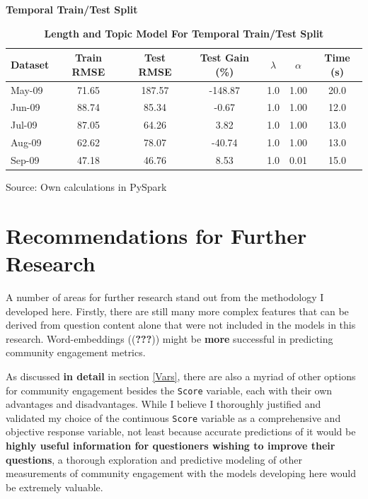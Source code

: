 \documentclass[11pt,preprint, authoryear]{article}
\numberwithin{equation}{section}
\begin{document}
\normalsize

\textbf{Temporal Train/Test Split}

\footnotesize

\begin{longtable}[htbp] {@{} lcccccc @{}} 
\caption{\textbf{Length and Topic Model For Temporal Train/Test Split}} 
\label{tab:time_token_model} \\
\toprule
\textbf{Dataset} &  \textbf{Train RMSE} &  \textbf{Test RMSE} &  \textbf{Test Gain (\%)} & \textbf{$\lambda$} & \textbf{$\alpha$} &  \textbf{Time (s)} \\
\midrule
May-09 &            71.65 &        187.57 &        -148.87 &              1.0 &             1.00 &           20.0 \\
Jun-09 &            88.74 &         85.34 &          -0.67 &              1.0 &             1.00 &           12.0 \\
Jul-09 &            87.05 &         64.26 &           3.82 &              1.0 &             1.00 &           13.0 \\
Aug-09 &            62.62 &         78.07 &         -40.74 &              1.0 &             1.00 &           13.0 \\
Sep-09 &            47.18 &         46.76 &           8.53 &              1.0 &             0.01 &           15.0 \\
\bottomrule
\end{longtable}\begin{center} Source: Own calculations in PySpark\end{center}

\normalsize

\newpage

\section{\texorpdfstring{Recommendations for Further Research
\label{Recom}}{Recommendations for Further Research }}\label{recommendations-for-further-research}

A number of areas for further research stand out from the methodology I
developed here. Firstly, there are still many more complex features that
can be derived from question content alone that were not included in the
models in this research. Word-embeddings (({\textbf{???}})) might be
\textbf{more} successful in predicting community engagement metrics.

As discussed \textbf{in detail} in section \ref{Vars}, there are also a
myriad of other options for community engagement besides the
\texttt{Score} variable, each with their own advantages and
disadvantages. While I believe I thoroughly justified and validated my
choice of the continuous \texttt{Score} variable as a comprehensive and
objective response variable, not least because accurate predictions of
it would be \textbf{highly useful information for questioners wishing to
improve their questions}, a thorough exploration and predictive modeling
of other measurements of community engagement with the models developing
here would be extremely valuable.
\end{document}
